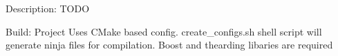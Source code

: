 Description\+: T\+O\+DO 

 Build\+: Project Uses C\+Make based config. \textquotesingle{}create\+\_\+configs.\+sh\textquotesingle{} shell script will generate ninja files for compilation. Boost and thearding libaries are required 